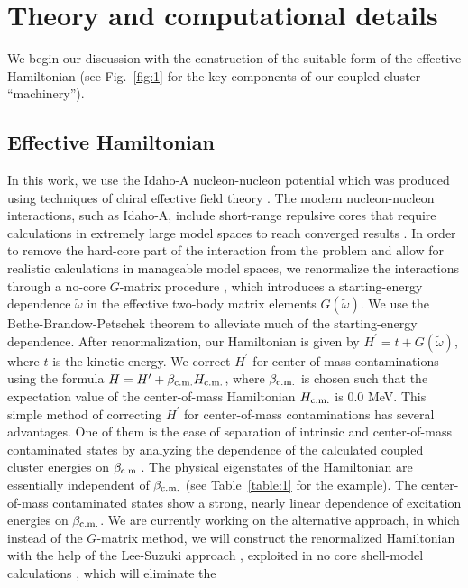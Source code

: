 \documentclass[epj]{svjour}
\begin{document}
\section{Theory and computational details}
\label{section:2}
We begin our discussion with the
construction of the suitable
form of the effective Hamiltonian (see Fig.~\ref{fig:1} for the key components
of our coupled cluster ``machinery'').
\subsection{Effective Hamiltonian}
\label{section:2.1}
In this work, we use the Idaho-A nucleon-nucleon potential
\cite{entem2002} which was produced using techniques of chiral
effective field theory \cite{eft}. The
modern nucleon-nucleon interactions, such as Idaho-A, include short-range
repulsive cores that require calculations in extremely large model
spaces to reach converged results \cite{bogdan}. In order to remove the
hard-core part of the interaction from the problem and allow
for realistic calculations in manageable model spaces, we renormalize
the interactions through a no-core $G$-matrix procedure \cite{dean04},
which introduces a starting-energy dependence $\tilde{\omega}$
in the effective two-body matrix
elements $G(\tilde{\omega})$. We use the Bethe-Brandow-Petschek
\cite{bbp63} theorem to alleviate much of the starting-energy
dependence. After renormalization,
our Hamiltonian is given by $H^{\prime}=t+G(\tilde{\omega})$, where
$t$ is the kinetic energy. We correct $H^{\prime}$ for center-of-mass
contaminations using the formula $H=H^{\prime}+\beta_{\rm c.m.}H_{\rm c.m.}$,
where $\beta_{\rm c.m.}$ is chosen such that the expectation value of
the center-of-mass Hamiltonian $H_{\rm c.m.}$ is 0.0 MeV.
This simple method of correcting $H^{\prime}$ for center-of-mass
contaminations has several advantages. One of them is the ease
of separation of intrinsic and center-of-mass contaminated states
by analyzing the dependence of the calculated coupled cluster energies on
$\beta_{\rm c.m.}$. The physical eigenstates of the Hamiltonian are essentially
independent of $\beta_{\rm c.m.}$ (see Table~\ref{table:1} for the
example).
The center-of-mass contaminated
states show a strong, nearly linear
dependence of excitation energies on $\beta_{\rm c.m.}$.
We are currently working on the alternative approach, in which
instead of the $G$-matrix method, we will
construct the renormalized Hamiltonian with the help of the
Lee-Suzuki approach \cite{leesuzuki}, exploited in no core shell-model
calculations \cite{navratil02}, which will eliminate the
\end{document}
